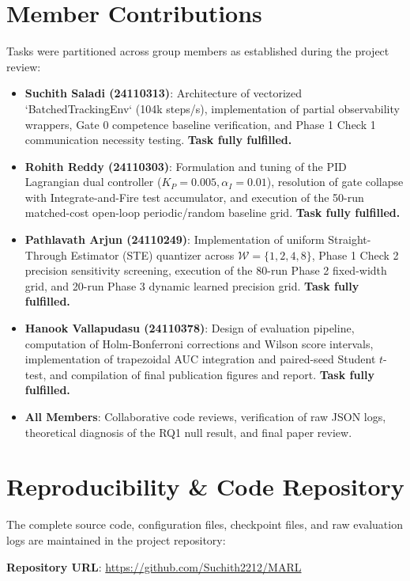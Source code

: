 \documentclass[10pt,twocolumn,letterpaper]{article}
\begin{document}
\section{Member Contributions}

Tasks were partitioned across group members as established during the project review:
\begin{itemize}
    \item \textbf{Suchith Saladi (24110313)}: Architecture of vectorized `BatchedTrackingEnv` (104k steps/s), implementation of partial observability wrappers, Gate 0 competence baseline verification, and Phase 1 Check 1 communication necessity testing. \textbf{Task fully fulfilled.}
    \item \textbf{Rohith Reddy (24110303)}: Formulation and tuning of the PID Lagrangian dual controller ($K_P=0.005, \alpha_I=0.01$), resolution of gate collapse with Integrate-and-Fire test accumulator, and execution of the 50-run matched-cost open-loop periodic/random baseline grid. \textbf{Task fully fulfilled.}
    \item \textbf{Pathlavath Arjun (24110249)}: Implementation of uniform Straight-Through Estimator (STE) quantizer across $\mathcal{W}=\{1, 2, 4, 8\}$, Phase 1 Check 2 precision sensitivity screening, execution of the 80-run Phase 2 fixed-width grid, and 20-run Phase 3 dynamic learned precision grid. \textbf{Task fully fulfilled.}
    \item \textbf{Hanook Vallapudasu (24110378)}: Design of evaluation pipeline, computation of Holm-Bonferroni corrections and Wilson score intervals, implementation of trapezoidal AUC integration and paired-seed Student $t$-test, and compilation of final publication figures and report. \textbf{Task fully fulfilled.}
    \item \textbf{All Members}: Collaborative code reviews, verification of raw JSON logs, theoretical diagnosis of the RQ1 null result, and final paper review.
\end{itemize}

\section{Reproducibility \& Code Repository}

The complete source code, configuration files, checkpoint files, and raw evaluation logs are maintained in the project repository:
\begin{center}
    \textbf{Repository URL}: \url{https://github.com/Suchith2212/MARL}
\end{center}
\end{document}
